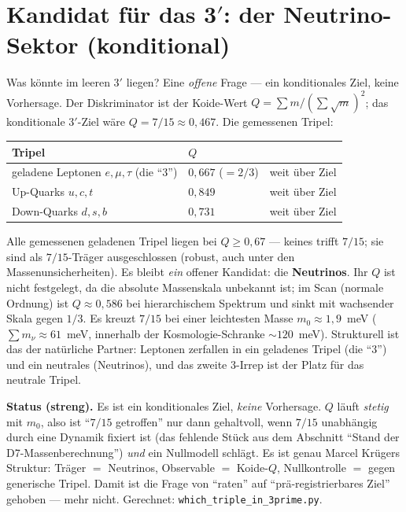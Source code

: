 \section{Kandidat f\"ur das 3$'$: der Neutrino-Sektor (konditional)}
Was k\"onnte im leeren 3$'$ liegen? Eine \emph{offene} Frage --- ein konditionales Ziel, keine
Vorhersage. Der Diskriminator ist der Koide-Wert $Q=\sum m/(\sum\sqrt m)^2$; das konditionale
3$'$-Ziel w\"are $Q=7/15\approx0{,}467$. Die gemessenen Tripel:

\begin{center}\small\renewcommand{\arraystretch}{1.2}
\begin{tabular}{@{}p{5.6cm} p{2.6cm} p{3.4cm}@{}}
\toprule
Tripel & $Q$ & \\
\midrule
geladene Leptonen $e,\mu,\tau$ (die \enquote{$3$}) & $0{,}667$ ($=2/3$) & weit \"uber Ziel \\
Up-Quarks $u,c,t$ & $0{,}849$ & weit \"uber Ziel \\
Down-Quarks $d,s,b$ & $0{,}731$ & weit \"uber Ziel \\
\bottomrule
\end{tabular}
\end{center}

\noindent Alle gemessenen geladenen Tripel liegen bei $Q\ge0{,}67$ --- keines trifft $7/15$;
sie sind als $7/15$-Tr\"ager ausgeschlossen (robust, auch unter den Massenunsicherheiten). Es
bleibt \emph{ein} offener Kandidat: die \textbf{Neutrinos}. Ihr $Q$ ist nicht festgelegt, da die
absolute Massenskala unbekannt ist; im Scan (normale Ordnung) ist $Q\approx0{,}586$ bei
hierarchischem Spektrum und sinkt mit wachsender Skala gegen $1/3$. Es kreuzt $7/15$ bei einer
leichtesten Masse $m_0\approx1{,}9$~meV ($\sum m_\nu\approx61$~meV, innerhalb der
Kosmologie-Schranke $\sim120$~meV). Strukturell ist das der nat\"urliche Partner: Leptonen
zerfallen in ein geladenes Tripel (die \enquote{$3$}) und ein neutrales (Neutrinos), und das
zweite $3$-Irrep ist der Platz f\"ur das neutrale Tripel.

\medskip\noindent\textbf{Status (streng).} Es ist ein konditionales Ziel, \emph{keine}
Vorhersage. $Q$ l\"auft \emph{stetig} mit $m_0$, also ist \enquote{$7/15$ getroffen} nur dann
gehaltvoll, wenn $7/15$ unabh\"angig durch eine Dynamik fixiert ist (das fehlende St\"uck aus dem
Abschnitt \enquote{Stand der D7-Massenberechnung}) \emph{und} ein Nullmodell schl\"agt. Es ist
genau Marcel Kr\"ugers Struktur: Tr\"ager $=$ Neutrinos, Observable $=$ Koide-$Q$, Nullkontrolle
$=$ gegen generische Tripel. Damit ist die Frage von \enquote{raten} auf
\enquote{pr\"a-registrierbares Ziel} gehoben --- mehr nicht. Gerechnet:
\texttt{which\_triple\_in\_3prime.py}.


